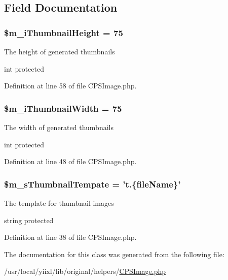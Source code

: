 \subsection{Field Documentation}
\hypertarget{classCPSImage_a31914fa7bb06596b268b9dbf4aabe9b1}{
\subsubsection[{\$m\_\-iThumbnailHeight}]{\setlength{\rightskip}{0pt plus 5cm}\$m\_\-iThumbnailHeight = 75}}
\label{classCPSImage_a31914fa7bb06596b268b9dbf4aabe9b1}
The height of generated thumbnails

int  protected 

Definition at line 58 of file CPSImage.php.

\hypertarget{classCPSImage_a2f67e1aa9031010559601184c28397e0}{
\subsubsection[{\$m\_\-iThumbnailWidth}]{\setlength{\rightskip}{0pt plus 5cm}\$m\_\-iThumbnailWidth = 75}}
\label{classCPSImage_a2f67e1aa9031010559601184c28397e0}
The width of generated thumbnails

int  protected 

Definition at line 48 of file CPSImage.php.

\hypertarget{classCPSImage_a28221a0c54da49994a1f96ec06ef4280}{
\subsubsection[{\$m\_\-sThumbnailTempate}]{\setlength{\rightskip}{0pt plus 5cm}\$m\_\-sThumbnailTempate = 't.\{fileName\}'}}
\label{classCPSImage_a28221a0c54da49994a1f96ec06ef4280}
The template for thumbnail images

string  protected 

Definition at line 38 of file CPSImage.php.



The documentation for this class was generated from the following file:\begin{DoxyCompactItemize}
\item 
/usr/local/yiixl/lib/original/helpers/\hyperlink{CPSImage_8php}{CPSImage.php}\end{DoxyCompactItemize}
